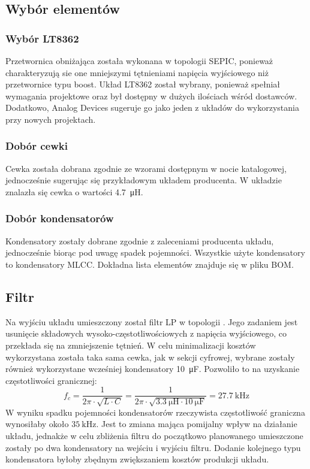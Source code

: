 \documentclass{article}
\begin{document}
\subsection{Wybór elementów}
\subsubsection{Wybór LT8362}
Przetwornica obniżająca została wykonana w topologii SEPIC, ponieważ charakteryzują sie one mniejszymi tętnieniami napięcia wyjściowego niż przetwornice typu boost. Układ LT8362 został wybrany, ponieważ spełniał wymagania projektowe oraz był dostępny w dużych ilościach wśród dostawców. Dodatkowo, Analog Devices sugeruje go jako jeden z układów do wykorzystania przy nowych projektach.

\subsubsection{Dobór cewki}
Cewka została dobrana zgodnie ze wzorami dostępnym w nocie katalogowej, jednocześnie sugerując się przykładowym układem producenta. W układzie znalazła się cewka o wartości \SI{4.7}{\micro\henry}.

\subsubsection{Dobór kondensatorów}
Kondensatory zostały dobrane zgodnie z zaleceniami producenta układu, jednocześnie biorąc pod uwagę spadek pojemności. Wszystkie użyte kondensatory to kondensatory MLCC. Dokładna lista elementów znajduje się w pliku BOM.

\subsection{Filtr}
Na wyjściu układu umieszczony został filtr LP w topologii \Pi. Jego zadaniem jest usunięcie składowych wysoko-częstotliwościowych z napięcia wyjściowego, co przekłada się na zmniejszenie tętnień. W celu minimalizacji kosztów wykorzystana została taka sama cewka, jak w sekcji cyfrowej, wybrane zostały również wykorzystane wcześniej kondensatory \SI{10}{\micro\farad}. Pozwoliło to na uzyskanie częstotliwości granicznej: $$f_c = \frac{1}{2\pi \cdot \sqrt{L \cdot C}} = \frac{1}{2\pi \cdot \sqrt{\SI{3.3}{\micro\henry} \cdot \SI{10}{\micro\farad}}} = \SI{27.7}{\kilo\hertz}$$
W wyniku spadku pojemności kondensatorów rzeczywista częstotliwość graniczna wynosiłaby około $\SI{35}{\kilo\hertz}$. Jest to zmiana mająca pomijalny wpływ na działanie układu, jednakże w celu zbliżenia filtru do początkowo planowanego umieszczone zostały po dwa kondensatory na wejściu i wyjściu filtru. Dodanie kolejnego typu kondensatora byłoby zbędnym zwiększaniem kosztów produkcji układu.
\end{document}
